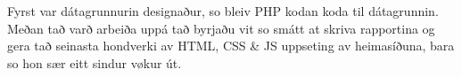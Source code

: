 \documentclass{article}
\begin{document}
\par Fyrst var dátagrunnurin designaður, so bleiv PHP kodan koda til dátagrunnin.
Meðan tað varð arbeiða uppá tað byrjaðu vit so smátt at skriva rapportina og gera tað
seinasta hondverki av HTML, CSS \& JS uppseting av heimasíðuna, bara so hon sær eitt sindur
vøkur út.


{}


{}


{}


{}

\end{document}
